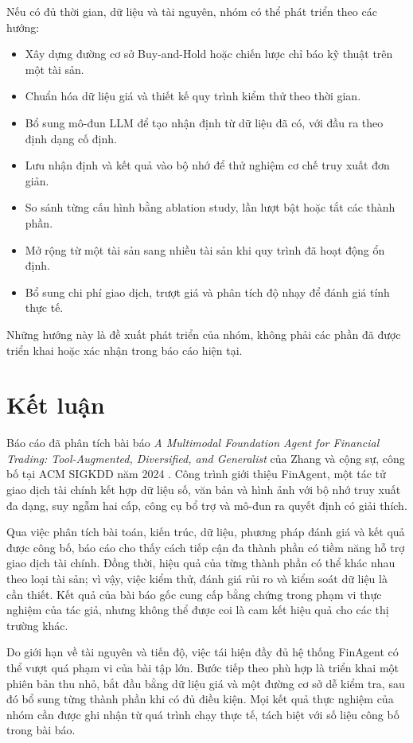Nếu có đủ thời gian, dữ liệu và tài nguyên, nhóm có thể phát triển theo các hướng:
\begin{itemize}
    \item Xây dựng đường cơ sở Buy-and-Hold hoặc chiến lược chỉ báo kỹ thuật trên một tài sản.
    \item Chuẩn hóa dữ liệu giá và thiết kế quy trình kiểm thử theo thời gian.
    \item Bổ sung mô-đun LLM để tạo nhận định từ dữ liệu đã có, với đầu ra theo định dạng cố định.
    \item Lưu nhận định và kết quả vào bộ nhớ để thử nghiệm cơ chế truy xuất đơn giản.
    \item So sánh từng cấu hình bằng ablation study, lần lượt bật hoặc tắt các thành phần.
    \item Mở rộng từ một tài sản sang nhiều tài sản khi quy trình đã hoạt động ổn định.
    \item Bổ sung chi phí giao dịch, trượt giá và phân tích độ nhạy để đánh giá tính thực tế.
\end{itemize}
Những hướng này là đề xuất phát triển của nhóm, không phải các phần đã được triển khai hoặc xác nhận trong báo cáo hiện tại.

\section{Kết luận}

Báo cáo đã phân tích bài báo \textit{A Multimodal Foundation Agent for Financial Trading: Tool-Augmented, Diversified, and Generalist} của Zhang và cộng sự, công bố tại ACM SIGKDD năm 2024 \cite{zhang2024finagent}. Công trình giới thiệu FinAgent, một tác tử giao dịch tài chính kết hợp dữ liệu số, văn bản và hình ảnh với bộ nhớ truy xuất đa dạng, suy ngẫm hai cấp, công cụ bổ trợ và mô-đun ra quyết định có giải thích.

Qua việc phân tích bài toán, kiến trúc, dữ liệu, phương pháp đánh giá và kết quả được công bố, báo cáo cho thấy cách tiếp cận đa thành phần có tiềm năng hỗ trợ giao dịch tài chính. Đồng thời, hiệu quả của từng thành phần có thể khác nhau theo loại tài sản; vì vậy, việc kiểm thử, đánh giá rủi ro và kiểm soát dữ liệu là cần thiết. Kết quả của bài báo gốc cung cấp bằng chứng trong phạm vi thực nghiệm của tác giả, nhưng không thể được coi là cam kết hiệu quả cho các thị trường khác.

Do giới hạn về tài nguyên và tiến độ, việc tái hiện đầy đủ hệ thống FinAgent có thể vượt quá phạm vi của bài tập lớn. Bước tiếp theo phù hợp là triển khai một phiên bản thu nhỏ, bắt đầu bằng dữ liệu giá và một đường cơ sở dễ kiểm tra, sau đó bổ sung từng thành phần khi có đủ điều kiện. Mọi kết quả thực nghiệm của nhóm cần được ghi nhận từ quá trình chạy thực tế, tách biệt với số liệu công bố trong bài báo.
